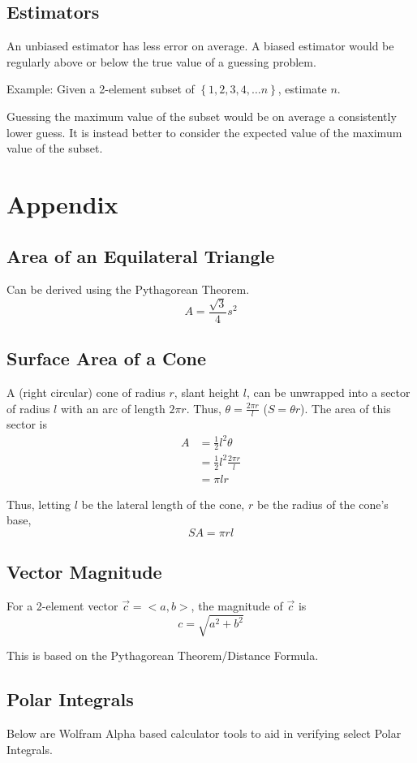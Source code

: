 \documentclass{article}
\begin{document}
\subsection{Estimators}
An unbiased estimator has less error on average. A biased estimator would be regularly above or below the true value of a guessing problem.

Example:
Given a 2-element subset of $\left\{1,2,3,4,\ldots n\right\}$, estimate $n$.

Guessing the maximum value of the subset would be on average a consistently lower guess. It is instead better to consider the expected value of the maximum value of the subset.

\section{Appendix}
\subsection{Area of an Equilateral Triangle}
Can be derived using the Pythagorean Theorem.
$$A = \frac{\sqrt{3}}{4}s^2$$

\subsection{Surface Area of a Cone}
A (right circular) cone of radius $r$, slant height $l$, can be unwrapped into a sector of radius $l$ with an arc of length $2 \pi r$. Thus, $\theta = \frac{2\pi r}{l}$ ($S = \theta r$).
The area of this sector is
\begin{align*}
    A & = \frac{1}{2} l^2 \theta  \\
      & = \frac{1}{2}l^2\frac{2\pi r}{l}  \\
      & = \pi lr
\end{align*}

Thus, letting $l$ be the lateral length of the cone, $r$ be the radius of the cone's base,
$$SA = \pi rl$$

\subsection{Vector Magnitude}
For a 2-element vector $\Vec{c} = <a,b>$, the magnitude of $\Vec{c}$ is
$$c = \sqrt{a^2 + b^2}$$

This is based on the Pythagorean Theorem/Distance Formula.

\subsection{Polar Integrals}
Below are Wolfram Alpha based calculator tools to aid in verifying select Polar Integrals.
\end{document}
